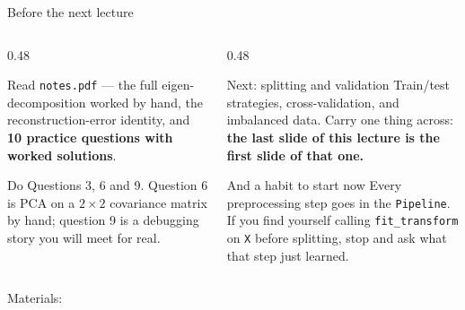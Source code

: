 \documentclass[aspectratio=169]{beamer}
\begin{document}
\begin{frame}[shrink=3]{Before the next lecture}
  \begin{columns}[T]
    \begin{column}{0.48\textwidth}
      \begin{block}{Read}
        \texttt{notes.pdf} --- the full eigen-decomposition worked by hand,
        the reconstruction-error identity, and \textbf{10 practice questions
        with worked solutions}.
      \end{block}
      \begin{block}{Do}
        Questions 3, 6 and 9. Question 6 is PCA on a $2\times2$ covariance
        matrix by hand; question 9 is a debugging story you will meet for
        real.
      \end{block}
    \end{column}
    \begin{column}{0.48\textwidth}
      \begin{exampleblock}{Next: splitting and validation}
        Train/test strategies, cross-validation, and imbalanced data. Carry
        one thing across: \textbf{the last slide of this lecture is the first
        slide of that one.}
      \end{exampleblock}
      \begin{alertblock}{And a habit to start now}
        Every preprocessing step goes in the \texttt{Pipeline}. If you find
        yourself calling \texttt{fit\_transform} on \texttt{X} before
        splitting, stop and ask what that step just learned.
      \end{alertblock}
    \end{column}
  \end{columns}
  \begin{center}
    \small Materials: \texttt{\AMLRepoURL}
  \end{center}
  \slidesources{\AMLUnitIVSources}
\end{frame}
\end{document}
